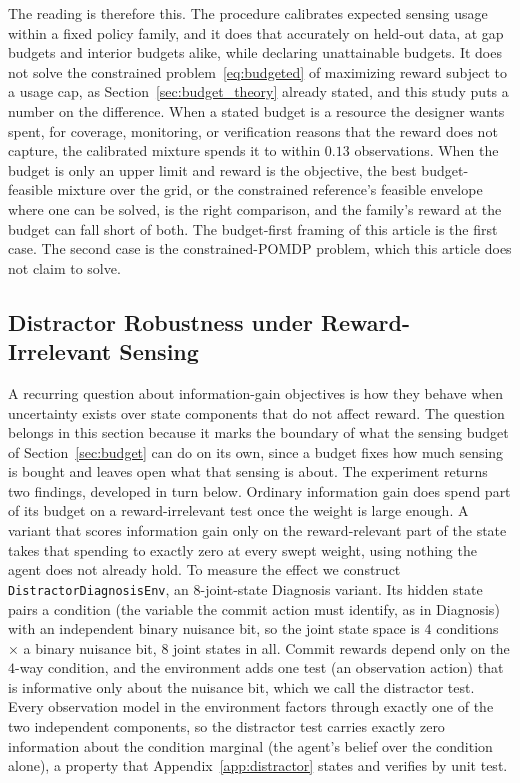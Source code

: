 The reading is therefore this. The procedure calibrates expected sensing usage within a fixed policy family, and it does that accurately on held-out data, at gap budgets and interior budgets alike, while declaring unattainable budgets. It does not solve the constrained problem~\eqref{eq:budgeted} of maximizing reward subject to a usage cap, as Section~\ref{sec:budget_theory} already stated, and this study puts a number on the difference. When a stated budget is a resource the designer wants spent, for coverage, monitoring, or verification reasons that the reward does not capture, the calibrated mixture spends it to within $0.13$ observations. When the budget is only an upper limit and reward is the objective, the best budget-feasible mixture over the grid, or the constrained reference's feasible envelope where one can be solved, is the right comparison, and the family's reward at the budget can fall short of both. The budget-first framing of this article is the first case. The second case is the constrained-POMDP problem, which this article does not claim to solve.



\subsection{Distractor Robustness under Reward-Irrelevant Sensing}
\label{sec:distractor}

A recurring question about information-gain objectives is how they behave when uncertainty exists over state components that do not affect reward. The question belongs in this section because it marks the boundary of what the sensing budget of Section~\ref{sec:budget} can do on its own, since a budget fixes how much sensing is bought and leaves open what that sensing is about. The experiment returns two findings, developed in turn below. Ordinary information gain does spend part of its budget on a reward-irrelevant test once the weight is large enough. A variant that scores information gain only on the reward-relevant part of the state takes that spending to exactly zero at every swept weight, using nothing the agent does not already hold. To measure the effect we construct \texttt{DistractorDiagnosisEnv}, an $8$-joint-state Diagnosis variant. Its hidden state pairs a condition (the variable the commit action must identify, as in Diagnosis) with an independent binary nuisance bit, so the joint state space is $4$ conditions $\times$ a binary nuisance bit, $8$ joint states in all. Commit rewards depend only on the $4$-way condition, and the environment adds one test (an observation action) that is informative only about the nuisance bit, which we call the distractor test. Every observation model in the environment factors through exactly one of the two independent components, so the distractor test carries exactly zero information about the condition marginal (the agent's belief over the condition alone), a property that Appendix~\ref{app:distractor} states and verifies by unit test.

